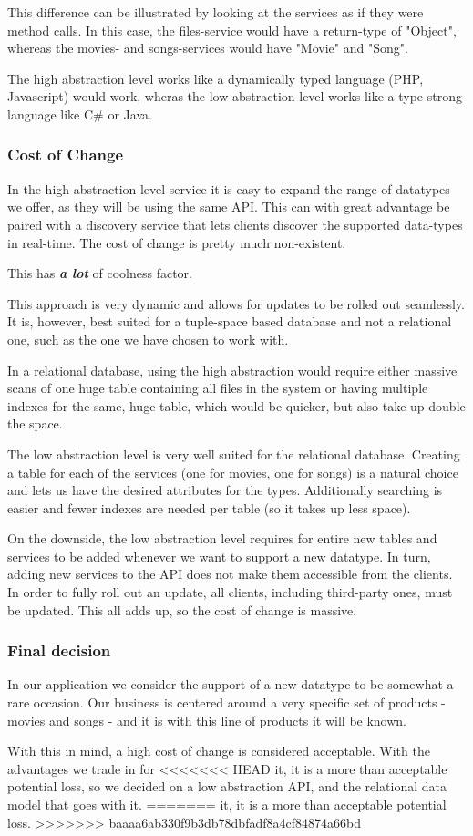 This difference can be illustrated by looking at the services as if they were method calls.
In this case, the files-service would have a return-type of "Object", whereas the movies-
and songs-services would have "Movie" and "Song".

The high abstraction level works like a dynamically typed language (PHP, Javascript) would
work, wheras the low abstraction level works like a type-strong language like C\# or Java.

\subsubsection{Cost of Change}
In the high abstraction level service it is easy to expand the range of datatypes we offer,
as they will be using the same API. This can with great advantage be paired with a discovery
service that lets clients discover the supported data-types in real-time. The cost of change
is pretty much non-existent.

This has \textbf{\emph{a lot}} of coolness factor.

This approach is very dynamic and allows for updates to be rolled out seamlessly. It is, however,
best suited for a tuple-space based database and not a relational one, such as the one we have
chosen to work with.

In a relational database, using the high abstraction would require either massive scans of one
huge table containing all files in the system or having multiple indexes for the same, huge table,
which would be quicker, but also take up double the space.

The low abstraction level is very well suited for the relational database. Creating a table for each
of the services (one for movies, one for songs) is a natural choice and lets us have the desired
attributes for the types. Additionally searching is easier and fewer indexes are needed per table
(so it takes up less space).

On the downside, the low abstraction level requires for entire new tables and services to be added
whenever we want to support a new datatype. In turn, adding new services to the API does not make
them accessible from the clients. In order to fully roll out an update, all clients,
including third-party ones, must be updated. This all adds up, so the cost of change is massive.

\subsubsection{Final decision}
In our application we consider the support of a new datatype to be somewhat a rare occasion. Our
business is centered around a very specific set of products - movies and songs - and it is with
this line of products it will be known.

With this in mind, a high cost of change is considered acceptable. With the advantages we trade in for
<<<<<<< HEAD
it, it is a more than acceptable potential loss, so we decided on a low abstraction API, and the relational
data model that goes with it.
=======
it, it is a more than acceptable potential loss.
>>>>>>> baaaa6ab330f9b3db78dbfadf8a4cf84874a66bd
